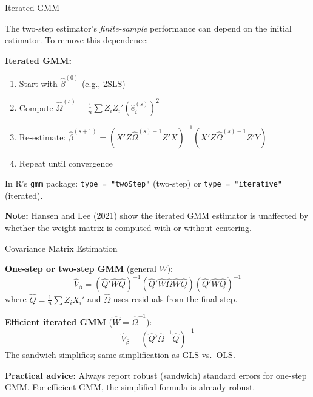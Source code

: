 \documentclass[aspectratio=169, handout, t]{beamer}
\numberwithin{equation}{section}
\begin{document}
\begin{frame}{Iterated GMM}

The two-step estimator's \textit{finite-sample} performance can depend on the initial estimator. To remove this dependence:

\medskip
\textbf{Iterated GMM:}
\begin{enumerate}
\item Start with $\hat\beta^{(0)}$ (e.g., 2SLS)
\item Compute $\hat\Omega^{(s)} = \frac{1}{n}\sum Z_iZ_i'(\hat e_i^{(s)})^2$
\item Re-estimate: $\hat\beta^{(s+1)} = (X'Z\hat\Omega^{(s)-1}Z'X)^{-1}(X'Z\hat\Omega^{(s)-1}Z'Y)$
\item Repeat until convergence
\end{enumerate}

\medskip
In R's \texttt{gmm} package: \texttt{type = "twoStep"} (two-step) or \texttt{type = "iterative"} (iterated).

\medskip
\textbf{Note:} Hansen and Lee (2021) show the iterated GMM estimator is unaffected by whether the weight matrix is computed with or without centering.

\end{frame}

\begin{frame}{Covariance Matrix Estimation}

\textbf{One-step or two-step GMM} (general $W$):
$$\hat V_\beta = (\hat Q'\hat W\hat Q)^{-1}(\hat Q'\hat W\hat\Omega\hat W\hat Q)(\hat Q'\hat W\hat Q)^{-1}$$
where $\hat Q = \frac{1}{n}\sum Z_iX_i'$ and $\hat\Omega$ uses residuals from the final step.

\medskip
\textbf{Efficient iterated GMM} ($\hat W = \hat\Omega^{-1}$):
$$\hat V_\beta = \left(\hat Q'\hat\Omega^{-1}\hat Q\right)^{-1}$$
The sandwich simplifies; same simplification as GLS vs.\ OLS.

\medskip
\begin{tcolorbox}[colback=blue!5, colframe=blue!50]
\textbf{Practical advice:} Always report robust (sandwich) standard errors for one-step GMM. For efficient GMM, the simplified formula is already robust.
\end{tcolorbox}

\end{frame}

\end{document}
